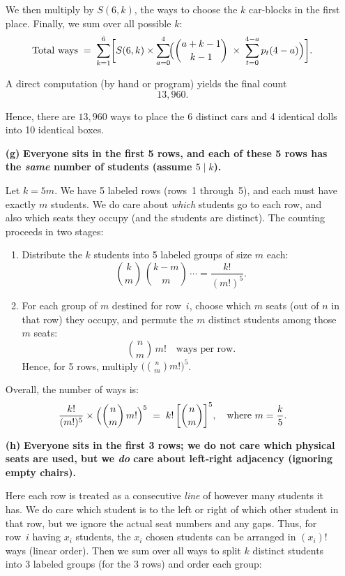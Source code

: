 \documentclass[docmute]{article}
\begin{document}
\begin{enumerate}
    We then multiply by \(S(6,k)\), the ways to choose the \(k\) car-blocks in the first place.  Finally, we sum over all possible \(k\):
    \[
    \text{Total ways}
    \;=\;
    \sum_{k=1}^{6}
    \biggl[
      S(6,k)
      \times
      \sum_{a=0}^{4}\!\Bigl(
          \binom{a + k - 1}{k - 1}
          \;\times\;
          \sum_{t=0}^{4-a} p_{t}(4-a)
      \Bigr)
    \biggr].
    \]
    
    A direct computation (by hand or program) yields the final count
    \[
    \boxed{13{,}960}.
    \]
    
    Hence, there are \(\boxed{13{,}960}\) ways to place the 6 distinct cars and 4 identical dolls into 10 identical boxes.
    
  \item[\textbf{(g)}]
    \textbf{Everyone sits in the first 5 rows, and each of these 5 rows has the \emph{same} number of students (assume $5\mid k$).}

    Let \(k=5m\).  We have 5 labeled rows (rows~1 through~5), and each must have exactly \(m\) students.  We do care about \emph{which} students go to each row, and also which seats they occupy (and the students are distinct).  The counting proceeds in two stages:

    \begin{enumerate}
      \item Distribute the $k$ students into 5 labeled groups of size $m$ each:
        \[
          \binom{k}{m}\,\binom{k-m}{m}\,\cdots = \frac{k!}{(m!)^5}.
        \]
      \item For each group of $m$ destined for row~$i$, choose which $m$ seats (out of $n$ in that row) they occupy, and permute the $m$ distinct students among those $m$ seats:
        \[
          \binom{n}{m}\,m! \quad\text{ways per row}.
        \]
      Hence, for 5 rows, multiply $\bigl(\binom{n}{m} m!\bigr)^5$.

    \end{enumerate}

    Overall, the number of ways is:
    \[
      \frac{k!}{(m!)^5} \times \Bigl(\binom{n}{m}\,m!\Bigr)^5
      \;=\;
      k!\,\biggl[\binom{n}{m}\biggr]^5,
      \quad\text{where }m=\frac{k}{5}.
    \]

  \item[\textbf{(h)}]
    \textbf{Everyone sits in the first 3 rows; we do not care which physical seats are used, but we \emph{do} care about left‐right adjacency (ignoring empty chairs).}

    Here each row is treated as a consecutive \emph{line} of however many students it has.  We do care which student is to the left or right of which other student in that row, but we ignore the actual seat numbers and any gaps.  Thus, for row~\(i\) having \(x_i\) students, the $x_i$ chosen students can be arranged in \((x_i)!\) ways (linear order).  Then we sum over all ways to split $k$ distinct students into 3 labeled groups (for the 3 rows) and order each group:


\end{enumerate}
\end{document}
